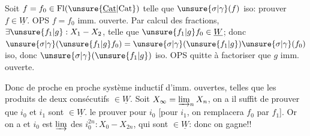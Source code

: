 Soit $f=f_0\in\operatorname{Fl}(\unsure{\underline{\mathrm{Cat}}|\mathrm{Cat}})$  telle que $\unsure{\sigma|\gamma}(f)$ iso: prouver $f\in\underline W$. OPS $f=f_0$ imm. ouverte. Par calcul des fractions, $\exists\unsure{f_1|g}:X_1\mathbin{-}X_2$, telle que $\unsure{f_1|g}f_0\in\underline W$; donc $\unsure{\sigma|\gamma}(\unsure{f_1|g}f_0)=\unsure{\sigma|\gamma}(\unsure{f_1|g})\unsure{\sigma|\gamma}(f_0)$ iso, donc $\unsure{\sigma|\gamma}(\unsure{f_1|g})$ iso. OPS quitte à factoriser que $g$ imm. ouverte.


Donc de proche en proche
système inductif d'imm. ouvertes, telles que les produits de deux consécutifs  $\in\underline W$. Soit $X_\infty=\varinjlim_n X_n$, on a
il suffit de prouver que $i_0$ et $i_1$ sont $\in\underline W$.
  le prouver pour $i_0$  [pour $i_1$, on remplacera $f_0$ par $f_1$]. Or on a
et $i_0$ est $\varinjlim$ des $i_0^{2n}:X_0\mathbin{-}X_{2n}$, qui sont $\in\underline W$: donc on gagne!!

